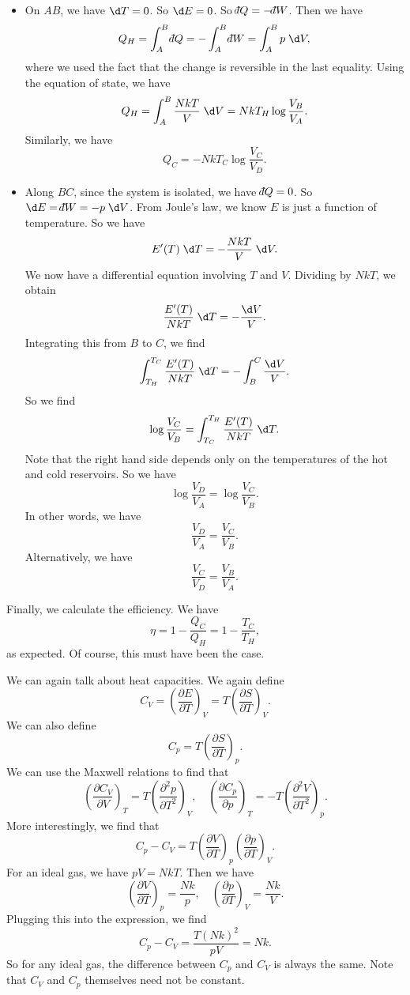 \documentclass[a4paper]{article}
\def\di{{\mathchar'26\mkern-12mu d}}
\begin{document}
\begin{itemize}
  \item On $AB$, we have $\d T = 0$. So $\d E = 0$. So $\di Q = - \di W$. Then we have
    \[
      Q_H = \int_A^B \di Q = - \int_A^B \di W = \int_A^B p \;\d V,
    \]
    where we used the fact that the change is reversible in the last equality. Using the equation of state, we have
    \[
      Q_H = \int_A^B \frac{NkT}{V}\;\d V = NkT_H \log \frac{V_B}{V_A}.
    \]
    Similarly, we have
    \[
      Q_C = - NkT_C \log \frac{V_C}{V_D}.
    \]
  \item Along $BC$, since the system is isolated, we have $\di Q = 0$. So $\d E = \di W = - p\;\d V$. From Joule's law, we know $E$ is just a function of temperature. So we have
    \[
      E'(T) \;\d T = - \frac{NkT}{V}\;\d V.
    \]
    We now have a differential equation involving $T$ and $V$. Dividing by $NkT$, we obtain
    \[
      \frac{E'(T)}{NkT}\;\d T = - \frac{\d V}{V}.
    \]
    Integrating this from $B$ to $C$, we find
    \[
      \int_{T_H}^{T_C} \frac{E'(T)}{NkT}\;\d T = - \int_B^C \frac{\d V}{V}.
    \]
    So we find
    \[
      \log \frac{V_C}{V_B} = \int_{T_C}^{T_H} \frac{E'(T)}{NkT}\;\d T.
    \]
    Note that the right hand side depends only on the temperatures of the hot and cold reservoirs. So we have
    \[
      \log \frac{V_D}{V_A} = \log \frac{V_C}{V_B}.
    \]
    In other words, we have
    \[
      \frac{V_D}{V_A} = \frac{V_C}{V_B}.
    \]
    Alternatively, we have
    \[
      \frac{V_C}{V_D} = \frac{V_B}{V_A}.
    \]
\end{itemize}
Finally, we calculate the efficiency. We have
\[
  \eta = 1 - \frac{Q_C}{Q_H} = 1 - \frac{T_C}{T_H},
\]
as expected. Of course, this must have been the case.

We can again talk about heat capacities. We again define
\[
  C_V = \left(\frac{\partial E}{\partial T}\right)_V = T \left(\frac{\partial S}{\partial T}\right)_V.
\]
We can also define
\[
  C_p = T \left(\frac{\partial S}{\partial T}\right)_p.
\]
We can use the Maxwell relations to find that
\[
  \left(\frac{\partial C_V}{\partial V}\right)_T = T \left(\frac{\partial^2 p}{\partial T^2}\right)_V,\quad
  \left(\frac{\partial C_p}{\partial p}\right)_T = - T \left(\frac{\partial^2 V}{\partial T^2}\right)_p.
\]
More interestingly, we find that
\[
  C_p - C_V = T \left(\frac{\partial V}{\partial T}\right)_p \left(\frac{\partial p}{\partial T}\right)_V.
\]
For an ideal gas, we have $pV = NkT$. Then we have
\[
  \left(\frac{\partial V}{\partial T}\right)_p = \frac{Nk}{p},\quad \left(\frac{\partial p}{\partial T}\right)_V = \frac{Nk}{V}.
\]
Plugging this into the expression, we find
\[
  C_p - C_V = \frac{T(Nk)^2}{pV} = Nk.
\]
So for any ideal gas, the difference between $C_p$ and $C_V$ is always the same. Note that $C_V$ and $C_p$ themselves need not be constant.
\end{document}
